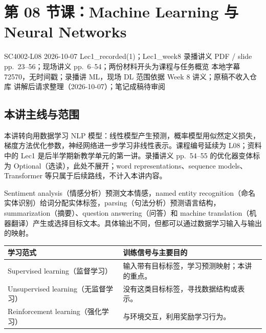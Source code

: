 
\section{第 08 节课：Machine Learning 与 Neural Networks}
\label{lecture:SC4002-L08}

\lecturemeta
  {SC4002-L08}
  {2026-10-07}
  {Lec1\_recorded(1)；Lec1\_week8}
  {录播讲义 PDF / slide pp.~23--56；现场讲义 pp.~6--54；两份材料开头为课程与任务概览}
  {本地字幕 72570，无时间戳；录播讲 ML，现场 DL 范围依据 Week 8 讲义；原稿不收入仓库}
  {讲解后请求整理（2026-10-07）；笔记成稿待审阅}

\subsection{本讲主线与范围}

本讲转向用数据学习 NLP 模型：线性模型产生预测，概率模型用似然定义损失，梯度方法优化参数，神经网络进一步学习非线性表示。课程编号延续为 L08；资料中的 Lec1 是后半学期新教学单元的第一讲。录播讲义 pp.~54--55 的优化器变体标为 Optional（选读），此处不展开；word representations、sequence models、Transformer 等只属于后续路线，不计入本讲内容。


Sentiment analysis（情感分析）预测文本情感，named entity recognition（命名实体识别）给词分配实体标签，parsing（句法分析）预测语言结构，summarization（摘要）、question answering（问答）和 machine translation（机器翻译）产生或选择目标文本。具体输出不同，但都可以通过数据学习输入与输出的映射。

\begin{center}
\begin{tabularx}{\textwidth}{@{}l X@{}}
\toprule
学习范式 & 训练信号与主要目的 \\
\midrule
Supervised learning（监督学习） & 输入带有目标标签，学习预测映射；本讲的重点。\\
Unsupervised learning（无监督学习） & 没有这类目标标签，寻找数据结构或表示。\\
Reinforcement learning（强化学习） & 与环境交互，利用奖励学习行为。\\
\bottomrule
\end{tabularx}
\end{center}


